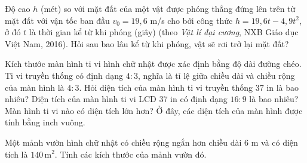 \begin{exercises}
\begin{questions}[resume=SGK]
        \item Độ cao $h$ (mét) so với mặt đất của một vật được phóng thẳng đứng lên trên từ mặt đất với vận tốc ban đầu $v_0=19{,}6$ m/s cho bởi công thức $h=19{,}6t-4{,}9t^2$, ở đó $t$ là thời gian kể từ khi phóng (giây) (theo \textit{Vật lí đại cương}, NXB Giáo dục Việt Nam, 2016). Hỏi sau bao lâu kể từ khi phóng, vật sẽ rơi trở lại mặt đất?

        \answerline
        \answerline

        \item Kích thước màn hình ti vi hình chữ nhật được xác định bằng độ dài đường chéo. Ti vi truyền thống có định dạng $4:3$, nghĩa là tỉ lệ giữa chiều dài và chiều rộng của màn hình là $4:3$. Hỏi diện tích của màn hình ti vi truyền thống $37$ in là bao nhiêu? Diện tích của màn hình ti vi LCD $37$ in có định dạng $16:9$ là bao nhiêu? Màn hình ti vi nào có diện tích lớn hơn? Ở đây, các diện tích của màn hình được tính bằng inch vuông.


        \answerline
        \answerline
        \answerline

        \item Một mảnh vườn hình chữ nhật có chiều rộng ngắn hơn chiều dài $6$ m và có diện tích là $140\,\text{m}^2$. Tính các kích thước của mảnh vườn đó.

        \answerline
        \answerline
    \end{questions}
\end{exercises}

